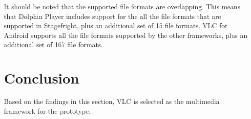 It should be noted that the supported file formats are overlapping. This means that Dolphin Player includes support for the all the file formats that are supported in Stagefright, plus an additional set of 15 file formats. VLC for Android supports all the file formats supported by the other frameworks, plus an additional set of 167 file formats.\\

\section{Conclusion}
Based on the findings in this section, VLC is selected as the multimedia framework for the prototype.




